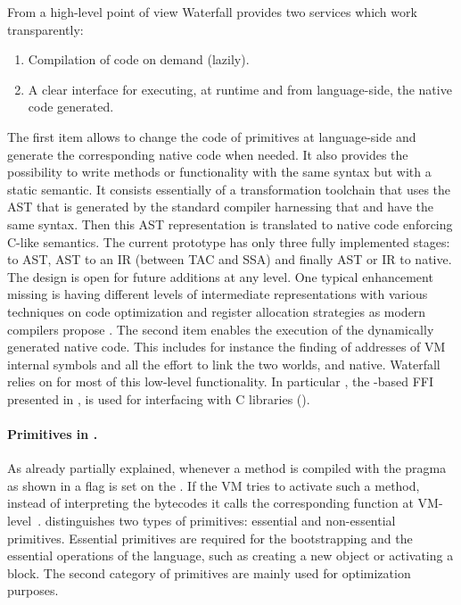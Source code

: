 From a high-level point of view Waterfall provides two services which work transparently: 
%
\begin{enumerate}
	\item Compilation of \Slang code on demand (lazily).
	\item A clear interface for executing, at runtime and from language-side, the native code generated.
\end{enumerate}
%
The first item allows to change the code of primitives at language-side and generate the corresponding native code when needed. 
It also provides the possibility to write methods or functionality with the same \ST syntax but with a static semantic. 
It consists essentially of a transformation toolchain that uses the AST that is generated by the standard \PH compiler harnessing that \Slang and \ST have the same syntax. 
Then this AST representation is translated to native code enforcing C-like \Slang semantics. The current prototype has only three fully implemented stages: \Slang to AST, AST to an IR (between TAC and SSA) and finally AST or IR to native. The design is open for future additions at any level. One typical enhancement missing is having different levels of intermediate representations with various techniques on code optimization and register allocation strategies as modern compilers propose \cite[Ch.\ 1]{Appe98a}. 
The second item enables the execution of the dynamically generated native code.
This includes for instance the finding of addresses of VM internal symbols and all the effort to link the two worlds, \ST and native.
Waterfall relies on \B for most of this low-level functionality.
In particular \NB, the \B-based FFI presented in , is used for interfacing with C libraries (). 

\paragraph{Primitives in \ST.}
As already partially explained, whenever a method is compiled with the  pragma as shown in  a flag is set on the . 
If the VM tries to activate such a method, instead of interpreting the bytecodes it calls the corresponding function at VM-level~\cite{Gold83a}.
\ST distinguishes two types of primitives: essential and non-essential primitives.
Essential primitives are required for the bootstrapping and the essential operations of the language, such as creating a new object or activating a block.
The second category of primitives are mainly used for optimization purposes.


